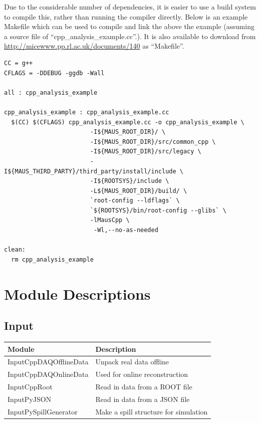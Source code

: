 \documentclass[a4paper,10pt]{article}
\begin{document}
Due to the considerable number of dependencies, it is easier to use a build system to compile this, rather than running the compiler directly.  Below is an example Makefile which can be used to compile and link the above the example (assuming a source file of ``cpp\_analysis\_example.cc''.). It is also available to download from \url{http://micewww.pp.rl.ac.uk/documents/140} as ``Makefile''.

\newpage

\lstset{style=custommake}

\begin{lstlisting}
CC = g++
CFLAGS = -DDEBUG -ggdb -Wall

all : cpp_analysis_example

cpp_analysis_example : cpp_analysis_example.cc
  $(CC) $(CFLAGS) cpp_analysis_example.cc -o cpp_analysis_example \
                        -I${MAUS_ROOT_DIR}/ \
                        -I${MAUS_ROOT_DIR}/src/common_cpp \
                        -I${MAUS_ROOT_DIR}/src/legacy \
                        -I${MAUS_THIRD_PARTY}/third_party/install/include \
                        -I${ROOTSYS}/include \
                        -L${MAUS_ROOT_DIR}/build/ \
                        `root-config --ldflags` \
                        `${ROOTSYS}/bin/root-config --glibs` \
                        -lMausCpp \
                         -Wl,--no-as-needed

clean:
  rm cpp_analysis_example
\end{lstlisting}

\appendix

\section{Module Descriptions}
\label{ModuleDescriptions}
  \subsection{Input}
    \begin{small}
    \noindent
      \renewcommand{\arraystretch}{1.5}
      \begin{tabular}{| l | l |}
        \hline
        \textbf{Module} & \textbf{Description} \\
        \hline
        InputCppDAQOfflineData & Unpack real data offline \\
        InputCppDAQOnlineData & Used for online reconstruction \\
        InputCppRoot & Read in data from a ROOT file \\
        InputPyJSON & Read in data from a JSON file \\
        InputPySpillGenerator & Make a spill structure for simulation \\
        \hline
      \end{tabular}
      \renewcommand{\arraystretch}{1.0}
    \end{small}
    
\end{document}
